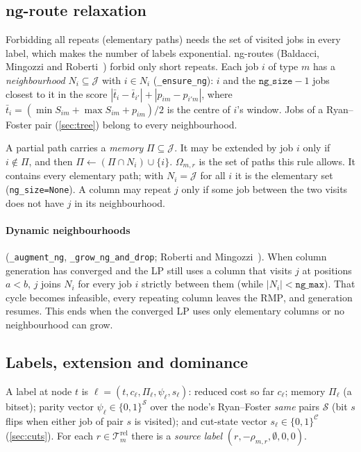 \documentclass[11pt,a4paper]{article}
\theoremstyle{definition}
\theoremstyle{remark}
\newcommand{\J}{\mathcal{J}}
\newcommand{\Rel}{\mathcal{T}^{\mathrm{rel}}}
\newcommand{\Om}{\Omega}
\newcommand{\Cuts}{\mathcal{C}}
\newcommand{\code}[1]{\texttt{#1}}
\newcommand{\RMP}{\mathrm{RMP}}
\begin{document}
\subsection{ng-route relaxation}\label{sec:ng}
Forbidding all repeats (elementary paths) needs the set of visited jobs in
every label, which makes the number of labels exponential. ng-routes
(Baldacci, Mingozzi and Roberti~\cite{baldacci2011}) forbid only short
repeats. Each job $i$ of type $m$ has a \emph{neighbourhood}
$N_i\subseteq\J$ with $i\in N_i$ (\code{\_ensure\_ng}): $i$ and the
$\texttt{ng\_size}-1$ jobs closest to it in the score
$|\bar t_i-\bar t_{i'}|+|p_{im}-p_{i'm}|$, where
$\bar t_i=(\min S_{im}+\max S_{im}+p_{im})/2$ is the centre of $i$'s window.
Jobs of a Ryan--Foster pair (\cref{sec:tree}) belong to every neighbourhood.

A partial path carries a \emph{memory} $\Pi\subseteq\J$. It may be extended by
job $i$ only if $i\notin\Pi$, and then $\Pi\leftarrow(\Pi\cap N_i)\cup\{i\}$.
$\Om_{m,r}$ is the set of paths this rule allows. It contains every elementary
path; with $N_i=\J$ for all $i$ it is the elementary set (\code{ng\_size=None}).
A column may repeat $j$ only if some job between the two visits does not have
$j$ in its neighbourhood.

\paragraph{Dynamic neighbourhoods} (\code{\_augment\_ng},
\code{\_grow\_ng\_and\_drop}; Roberti and Mingozzi~\cite{roberti2014}). When
column generation has converged and the LP still uses a column that visits $j$
at positions $a<b$, $j$ joins $N_i$ for every job $i$ strictly between them
(while $|N_i|<\texttt{ng\_max}$). That cycle becomes infeasible, every
repeating column leaves the $\RMP$, and generation resumes. This ends when the
converged LP uses only elementary columns or no neighbourhood can grow.

\subsection{Labels, extension and dominance}
A label at node $t$ is $\ell=(t,c_\ell,\Pi_\ell,\psi_\ell,s_\ell)$:
reduced cost so far $c_\ell$; memory $\Pi_\ell$ (a bitset); parity vector
$\psi_\ell\in\{0,1\}^{\mathcal S}$ over the node's Ryan--Foster \emph{same}
pairs $\mathcal S$ (bit $s$ flips when either job of pair $s$ is visited); and
cut-state vector $s_\ell\in\{0,1\}^{\Cuts}$ (\cref{sec:cuts}). For each
$r\in\Rel_m$ there is a \emph{source label} $(r,-\rho_{m,r},\emptyset,0,0)$.
\end{document}
